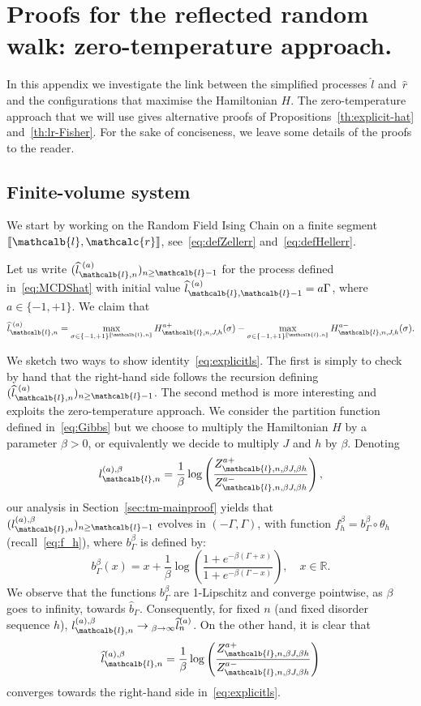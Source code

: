 \documentclass[AHL,Unicode,longabstracts,published]{cedram}
\newcommand{\bbR}{\mathbb{R}}
\newcommand{\gb}{\beta}
\newcommand{\gG}{\Gamma}
\newcommand{\ls}{\widehat{l}}
\newcommand{\rs}{\widehat{r}}
\renewcommand{\ell}{\mathcalb{l}}
\newcommand{\err}{\mathcalc{r}}
\newcommand{\llbracket}{\mathopen{[\mkern -2.7mu[}}
\newcommand{\rrbracket}{\mathclose{]\mkern -2.7mu]}}
\newcommand{\lbra}{\llbracket}
\newcommand{\rbra}{\rrbracket}
\renewcommand*{\to}{\mathchoice{\longrightarrow}{\rightarrow}{\rightarrow}{\rightarrow}}
\begin{document}
\section{Proofs for the reflected random walk: zero-temperature approach.}\label{sec:appendzerotemp}


In this appendix we investigate the link between the simplified processes $\ls$ and~$\rs$ and the configurations that maximise the Hamiltonian $H$. The zero-temperature approach that we will use gives alternative proofs of Propositions~\ref{th:explicit-hat} and~\ref{th:lr-Fisher}. For the sake of conciseness, we leave some details of the proofs to the reader.

\subsection{Finite-volume system}

We start by working on the {Random Field Ising Chain} on a finite segment $\lbra\ell, \err\rbra$, see~\eqref{eq:defZellerr} and~\eqref{eq:defHellerr}.


Let us write $(\ls_{\ell, n}^{\,\,(a)})_{n\ge \ell-1}$ for the process defined in~\eqref{eq:MCDShat} with initial value $\ls_{\ell,\ell-1}^{\,\,(a)}= a \gG$, where $a\in\{-1, +1\}$. We claim that
\begin{equation}\label{eq:explicitls}
\ls_{\ell, n}^{\,\,(a)} = \max_{\sigma\in\{-1, +1\}^{\lbra\ell, n\rbra}} H_{\ell, n, J, h}^{a+}(\sigma) - \max_{\sigma\in\{-1, +1\}^{\lbra\ell, n\rbra}} H_{\ell, n, J, h}^{a-}(\sigma).
\end{equation}

We sketch two ways to show identity~\eqref{eq:explicitls}. The first is simply to check by hand that the right-hand side follows the recursion defining $(\ls_{\ell, n}^{\,\,(a)})_{n\ge \ell-1}$. The second method is more interesting and exploits the zero-temperature approach. We consider the partition function defined in~\eqref{eq:Gibbs} but we choose to multiply the Hamiltonian $H$ by a parameter $\beta>0$, or equivalently we decide to multiply $J$ and $h$ by $\beta$. Denoting
\[
l_{\ell, n}^{(a), \beta}= \frac{1}{\beta} \log\left(\frac{Z_{\ell, n, \beta J, \beta h}^{a+}}{Z_{\ell, n, \beta J, \beta h}^{a-}}\right),
\]
our analysis in Section~\ref{sec:tm-mainproof} yields that $(l_{\ell, n}^{(a), \beta})_{n\ge \ell-1}$ evolves in $(-\gG, \gG)$, with function $f^\gb_h=b_\gG^\gb \circ \theta_h$ (recall~\eqref{eq:f_h}), where $b_\gG^\gb$ is defined by:
\begin{equation}
b_\gG^\gb(x)=x+\frac1\gb \log\left(\frac{1+e^{-\gb(\gG+x)}}{1+e^{-\gb(\gG-x)}}\right), \quad x\in \bbR.
\end{equation}
We observe that the functions $b_\gG^\gb$ are 1-Lipschitz and converge pointwise, as $\beta$ goes to infinity, towards $\widehat b_\gG$. Consequently, for fixed $n$ (and fixed disorder sequence $h$), $l_{\ell, n}^{(a), \beta} \to_{\beta\to\infty} \ls_n^{(a)}$. On the other hand, it is clear that
\[
\ls_{\ell, n}^{(a), \beta}= \frac{1}{\beta} \log\left(\frac{Z_{\ell, n, \beta J, \beta h}^{a+}}{Z_{\ell, n, \beta J, \beta h}^{a-}}\right)
\]
converges towards the right-hand side in~\eqref{eq:explicitls}.
\end{document}
